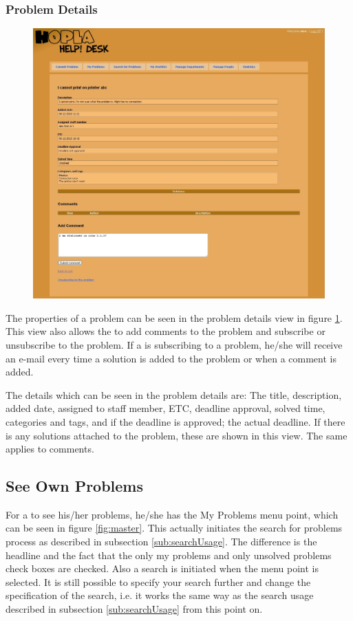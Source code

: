 \subsubsection{Problem Details}
\begin{figure}[H]
	\centering
		\includegraphics[width=1.00\textwidth, clip=true, trim=2.9cm 0.5cm 3cm 8cm]{input/implementation/program_presentation/problemDetails.png}
	\label{fig:problemDetails}
\end{figure}
The properties of a problem can be seen in the problem details view in figure \ref{fig:problemDetails}.
This view also allows the \aclient[] to add comments to the problem and subscribe or unsubscribe to the problem.
If a \aclient[] is subscribing to a problem, he/she will receive an e-mail every time a solution is added to the problem or when a comment is added.

The details which can be seen in the problem details are: The title, description, added date, assigned to staff member, ETC, deadline approval, solved time, categories and tags, and if the deadline is approved; the actual deadline.
If there is any solutions attached to the problem, these are shown in this view.
The same applies to comments.

\subsection{See Own Problems}
\label{sub:myProblem}
For a \aclient[] to see his/her problems, he/she has the My Problems menu point, which can be seen in figure \ref{fig:master}.
This actually initiates the search for problems process as described in subsection \ref{sub:searchUsage}.
The difference is the headline and the fact that the only my problems and only unsolved problems check boxes are checked.
Also a search is initiated when the menu point is selected.
It is still possible to specify your search further and change the specification of the search, i.e. it works the same way as the search usage described in subsection \ref{sub:searchUsage} from this point on.

